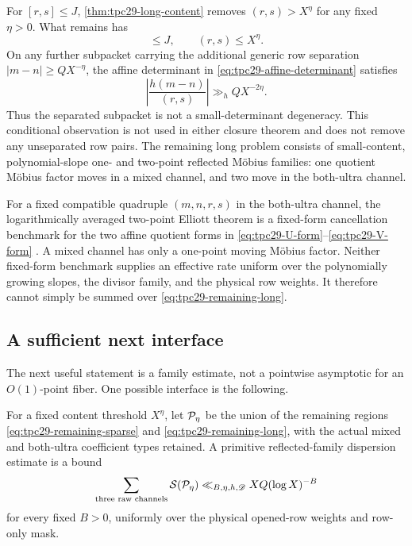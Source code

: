 For $[r,s]\le J$, \cref{thm:tpc29-long-content} removes
$(r,s)>X^\eta$ for any fixed $\eta>0$.  What remains has
\begin{equation}
 [r,s]\le J,\qquad (r,s)\le X^\eta.
 \label{eq:tpc29-remaining-long}
\end{equation}
On any further subpacket carrying the additional generic row
separation
$|m-n|\ge QX^{-\eta}$, the affine determinant in
\eqref{eq:tpc29-affine-determinant} satisfies
\begin{equation}
 \left|\frac{h(m-n)}{(r,s)}\right|
 \gg_{h}QX^{-2\eta}.
 \label{eq:tpc29-large-remaining-determinant}
\end{equation}
Thus the separated subpacket is not a small-determinant degeneracy.
This conditional observation is not used in either closure theorem
and does not remove any unseparated row pairs.  The remaining long
problem consists of small-content, polynomial-slope one- and
two-point reflected M\"obius families: one quotient M\"obius factor
moves in a mixed channel, and two move in the both-ultra channel.

For a fixed compatible quadruple $(m,n,r,s)$ in the both-ultra
channel, the logarithmically averaged two-point Elliott theorem is a
fixed-form cancellation benchmark for the two affine quotient forms
in \eqref{eq:tpc29-U-form}--\eqref{eq:tpc29-V-form}
\citep{Tao2016}.  A mixed channel has only a one-point moving M\"obius
factor.  Neither fixed-form benchmark supplies an effective rate
uniform over the polynomially growing slopes, the divisor family, and
the physical row weights.  It therefore cannot simply be summed over
\eqref{eq:tpc29-remaining-long}.

\subsection{A sufficient next interface}

The next useful statement is a family estimate, not a pointwise
asymptotic for an $O(1)$-point fiber.  One possible interface is the
following.

\begin{definition}
\label{def:tpc29-next-interface}
For a fixed content threshold $X^\eta$, let $\mathcal P_\eta$ be the union of
the remaining regions \eqref{eq:tpc29-remaining-sparse} and
\eqref{eq:tpc29-remaining-long}, with the actual mixed and both-ultra
coefficient types retained.  A primitive reflected-family dispersion
estimate is a bound
\begin{equation}
 \sum_{\textup{three raw channels}}
 \mathcal S(\mathcal P_\eta)
 \ll_{B,\eta,h,\mathscr D}XQ(\log X)^{-B}
 \label{eq:tpc29-next-dispersion}
\end{equation}
for every fixed $B>0$, uniformly over the physical opened-row weights
and row-only mask.
\end{definition}

